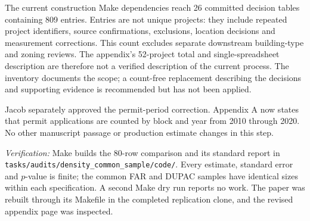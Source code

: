 The current construction Make dependencies reach 26 committed decision tables
containing 809 entries. Entries are not unique projects: they include repeated
project identifiers, source confirmations, exclusions, location decisions and
measurement corrections. This count excludes separate downstream building-type
and zoning reviews. The appendix's 52-project total and single-spreadsheet
description are therefore not a verified description of the current process.
The inventory documents the scope; a count-free replacement describing the
decisions and supporting evidence is recommended but has not been applied.

Jacob separately approved the permit-period correction. Appendix A now states
that permit applications are counted by block and year from 2010 through 2020.
No other manuscript passage or production estimate changes in this step.

\smallskip
\noindent\textit{Verification:} Make builds the 80-row comparison and its
standard report in \texttt{tasks/audits/density\_common\_sample/code/}.
Every estimate, standard error and $p$-value is finite; the common FAR and DUPAC
samples have identical sizes within each specification. A second Make dry run
reports no work. The paper was rebuilt through its Makefile in the completed
replication clone, and the revised appendix page was inspected.
